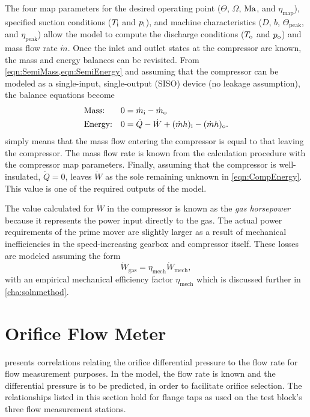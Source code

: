 The four map parameters for the desired operating point 
($\Theta$, $\Omega$, $\mathrm{Ma}$, and $\eta_{\text{map}}$), 
specified suction conditions ($T_{\text{i}}$ and $p_{\text{i}}$), 
and machine characteristics ($D$, $b$, $\Theta_{\text{peak}}$, and $\eta_{\text{peak}}$) 
allow the model to compute the discharge conditions ($T_{\text{o}}$ and $p_{\text{o}}$) 
and mass flow rate $\dot{m}$. 
%
Once the inlet and outlet states at the compressor are known, 
the mass and energy balances can be revisited. 
From \cref{eqn:SemiMass,eqn:SemiEnergy} and
assuming that the compressor can be modeled as a 
single-input, single-output (SISO) device (no leakage assumption), 
the balance equations become
\begin{align}
  &\text{Mass:}   & 0 &= {\dot{m}_{\text{i}}} - {\dot{m}_{\text{o}}} \label{eqn:CompMass}\\
  &\text{Energy:} & 0 &= \dot{Q} - \dot{W} + {(\dot{m}h)_{\text{i}}} - 
		{(\dot{m}h)_{\text{o}}} \label{eqn:CompEnergy}.
\end{align}
 simply means that the mass flow 
entering the compressor is equal to that leaving the compressor. 
The mass flow rate is known from the 
calculation procedure with the compressor map parameters. 
Finally, assuming that the compressor is well-insulated, 
$\dot{Q}=0$, leaves $\dot{W}$ 
as the sole remaining unknown in \cref{eqn:CompEnergy}. 
This value is one of the required outputs of the model. 

The value calculated for $\dot{W}$ in the compressor is known
as the \emph{gas horsepower} because it represents the power input
directly to the gas. The actual power requirements of the
prime mover are slightly larger as a result of mechanical inefficiencies
in the speed-increasing gearbox and compressor itself.
These losses are modeled assuming the form
\begin{equation}
  \dot{W}_{\text{gas}} = \eta_{\text{mech}}\dot{W}_{\text{mech}},
\end{equation}
with an empirical mechanical efficiency factor $\eta_{\text{mech}}$
which is discussed further in \cref{cha:solnmethod}.

\section{Orifice Flow Meter} \label{sec:Orifice}
\textcite{ptc19} presents correlations relating the orifice differential pressure to the
flow rate for flow measurement purposes.
In the model, the flow rate is known and the differential pressure is to be predicted,
in order to facilitate orifice selection.
The relationships listed in this section hold for flange taps as used
on the  test block's three flow measurement stations.

